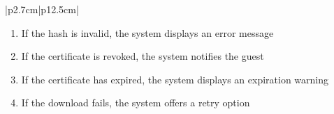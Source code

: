 \begin{table}[H]
\begin{tabular}{|p{2.7cm}|p{12.5cm}|}
\begin{minipage}[t]{\linewidth}
                                      \begin{enumerate}[topsep=0pt,itemsep=1pt,parsep=0pt,partopsep=0pt]
                                          \item If the hash is invalid, the system displays an error message
                                          \item If the certificate is revoked, the system notifies the guest
                                          \item If the certificate has expired, the system displays an expiration warning
                                          \item If the download fails, the system offers a retry option
                                      \end{enumerate}
                                  \end{minipage}      \\ \hline
    \end{tabular}
    \label{tab:guest-download-cert}
\end{table}

